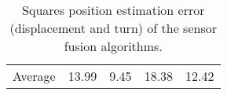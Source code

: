 \begin{table}[H]
\begin{center}
{\begin{tabular}[t]{lcccc}
                \hline
                Average          & 13.99                   & 9.45                   & 18.38           & 12.42
            \end{tabular}
        }
        \caption{Squares position estimation error (displacement and turn) of the sensor fusion algorithms. }
        \label{tab:squares}
    \end{center}
\end{table}